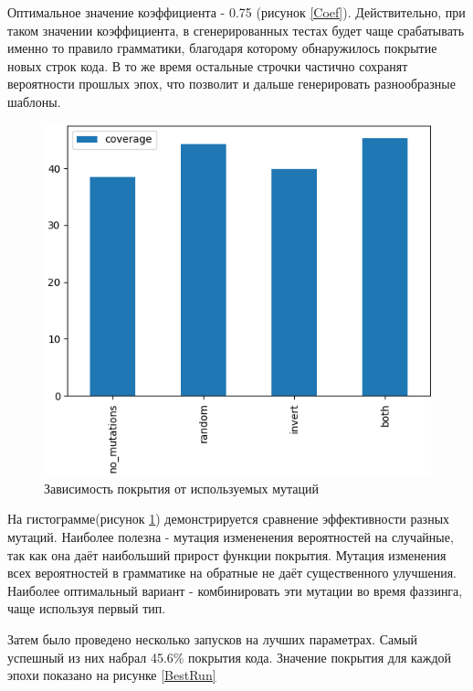 \documentclass[a4paper]{article}
\begin{document}
Оптимальное значение коэффициента - 0.75 (рисунок \ref{Coef}). Действительно, при таком значении коэффициента, в сгенерированных тестах будет чаще срабатывать именно то правило грамматики, благодаря которому обнаружилось покрытие новых строк кода. В то же время остальные строчки частично сохранят вероятности прошлых эпох, что позволит и дальше генерировать разнообразные шаблоны.

\begin{figure}[ht!]
    \includegraphics[width=130mm]{mutations.png}
    \caption{Зависимость покрытия от используемых мутаций}
    \label{Mutations}
    \end{figure}

На гистограмме(рисунок \ref{Mutations}) демонстрируется сравнение эффективности разных мутаций. Наиболее полезна - мутация измененения вероятностей на случайные, так как она даёт наибольший прирост функции покрытия. Мутация изменения всех вероятностей в грамматике на обратные не даёт существенного улучшения. Наиболее оптимальный вариант - комбинировать эти мутации во время фаззинга, чаще используя первый тип.

Затем было проведено несколько запусков на лучших параметрах. Самый успешный из них набрал 45.6\% покрытия кода. Значение покрытия для каждой эпохи показано на рисунке \ref{BestRun}
\end{document}
